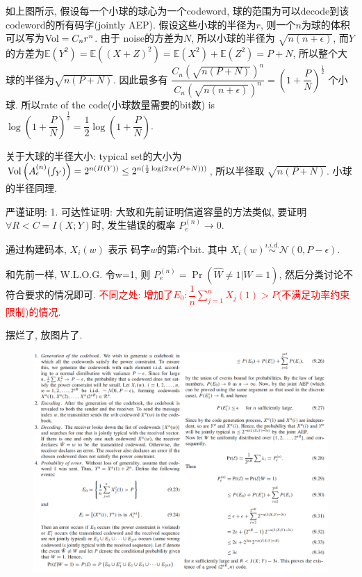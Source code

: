 如上图所示, 假设每一个小球的球心为一个codeword, 球的范围为可以decode到该codeword的所有码字(jointly AEP). 假设这些小球的半径为$r$, 则一个$n$为球的体积可以写为$\operatorname{Vol}=C_nr^n$. 由于 noise的方差为$N$, 所以小球的半径为 $\sqrt{n(n+\epsilon)}$, 而$Y$的方差为$\mathbb{E}(Y^2)=\mathbb{E}((X+Z)^2)=\mathbb{E}(X^2)+\mathbb{E}(Z^2)=P+N$, 所以整个大球的半径为$\sqrt{n(P+N)}$. 因此最多有 $\dfrac{C_n(\sqrt{n(P+N)})^n}{C_n(\sqrt{n(n+\epsilon)})^n}=\left(1+\dfrac{P}{N}\right)^{\frac{1}{2}}$ 个小球. 所以rate of the code(小球数量需要的bit数) is $\log \left(1+\dfrac{P}{N}\right)^{\frac{1}{2}}=\dfrac{1}{2}\log\left(1+\dfrac{P}{N}\right)$.

关于大球的半径大小: typical set的大小为$\operatorname{Vol}\left(A_{\epsilon}^{(n)}(f_Y)\right)=2^{n(H(Y))}\leq 2^{n(\frac{1}{2}\log(2\pi e (P+N)))}$, 所以半径取 $\sqrt{n(P+N)}$. 小球的半径同理.

严谨证明:
1. 可达性证明: 大致和先前证明信道容量的方法类似, 要证明$\forall R<C=I(X;Y)$时, 发生错误的概率 $P_e^{(n)}\to 0$.

通过构建码本, $X_i(w)$ 表示 码字$w$的第$i$个bit. 其中 $X_i(w)\stackrel{i.i.d.}{\sim} \mathcal{N}(0, P-\epsilon)$.

和先前一样, W.L.O.G. 令w=1, 则 $P_e^{(n)}=\Pr\left(\hat{W}\neq 1|W=1\right)$, 然后分类讨论不符合要求的情况即可. \textcolor{red}{不同之处: 增加了$E_0:\dfrac{1}{n}\sum\limits_{j=1}^n X_j(1)>P$(不满足功率约束限制)的情况}.

摆烂了, 放图片了.
\begin{figure}[htbp]
    \centering
    \includegraphics[width=1.25\textwidth]{./figures/chapter7/achievability.png}
\end{figure}

